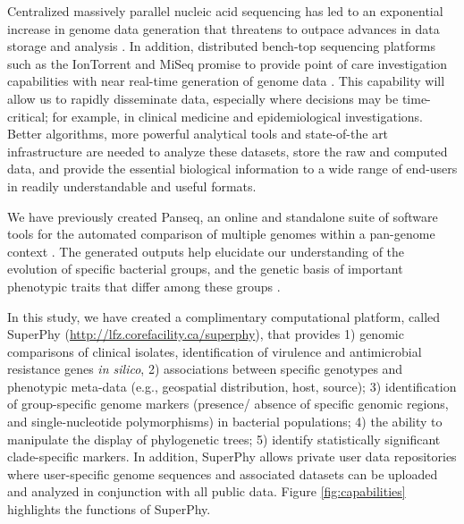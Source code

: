 \documentclass[a4paper,twoside]{article}
\begin{document}
\noindent Centralized massively parallel nucleic acid sequencing has led to an exponential increase in genome data generation that threatens to outpace advances in data storage and analysis \cite{kahn_future_2011,teeling_current_2012}. In addition, distributed bench-top sequencing platforms such as the IonTorrent and MiSeq promise to provide point of care investigation capabilities with near real-time generation of genome data \cite{loman_performance_2012}. This capability will allow us to rapidly disseminate data, especially where decisions may be time-critical; for example, in clinical medicine and epidemiological investigations. Better algorithms, more powerful analytical tools and state-of-the art infrastructure are needed to analyze these datasets, store the raw and computed data, and provide the essential biological information to a wide range of end-users in readily understandable and useful formats.

We have previously created Panseq, an online and standalone suite of software tools for the automated comparison of multiple genomes within a pan-genome context \cite{laing_pan-genome_2010,laing_identification_2011}. The generated outputs help elucidate our understanding of the evolution of specific bacterial groups, and the genetic basis of important phenotypic traits that differ among these groups \cite{laing_pan-genome_2010}.

In this study, we have created a complimentary computational platform, called SuperPhy (\url{http://lfz.corefacility.ca/superphy}), that provides 1) genomic comparisons of clinical isolates, identification of virulence and antimicrobial resistance genes \textit{in silico}, 2) associations between specific genotypes and phenotypic meta-data (e.g., geospatial distribution, host, source); 3) identification of group-specific genome markers (presence/ absence of specific genomic regions, and single-nucleotide polymorphisms) in bacterial populations; 4) the ability to manipulate the display of phylogenetic trees; 5) identify statistically significant clade-specific markers. In addition, SuperPhy allows private user data repositories where user-specific genome sequences and associated datasets can be uploaded and analyzed in conjunction with all public data. Figure \ref{fig:capabilities} highlights the functions of SuperPhy.
\end{document}
